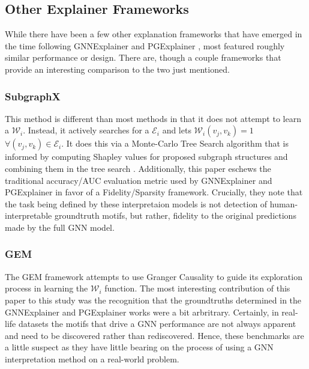 \subsection{Other Explainer Frameworks}
While there have been a few other explanation frameworks that have emerged in the time following GNNExplainer \cite{ying_gnnexplainer_2019} and PGExplainer \cite{luo_parameterized_2020}, most featured roughly similar performance or design. There are, though a couple frameworks that provide an interesting comparison to the two just mentioned.
\subsubsection{SubgraphX}
This method is different than most methods in that it does not attempt to learn a $\mathcal{W}_i$. Instead, it actively searches for a $\mathcal{E}_i$ and lets $\mathcal{W}_i(v_j, v_k) = 1$ $\forall (v_j, v_k) \in \mathcal{E}_i$. It does this via a Monte-Carlo Tree Search algorithm that is informed by computing Shapley values for proposed subgraph structures and combining them in the tree search \cite{yuan_explainability_2021}. Additionally, this paper eschews the traditional accuracy/AUC evaluation metric used by GNNExplainer and PGExplainer in favor of a Fidelity/Sparsity framework. Crucially, they note that the task being defined by these interpretaion models is not detection of human-interpretable groundtruth motifs, but rather, fidelity to the original predictions made by the full GNN model.
\subsubsection{GEM}
The GEM framework attempts to use Granger Causality to guide its exploration process in learning the $\mathcal{W}_i$ function. The most interesting contribution of this paper to this study was the recognition that the groundtruths determined in the GNNExplainer and PGExplainer works were a bit arbritrary. Certainly, in real-life datasets the motifs that drive a GNN performance are not always apparent and need to be discovered rather than rediscovered. Hence, these benchmarks are a little suspect as they have little bearing on the process of using a GNN interpretation method on a real-world problem.

